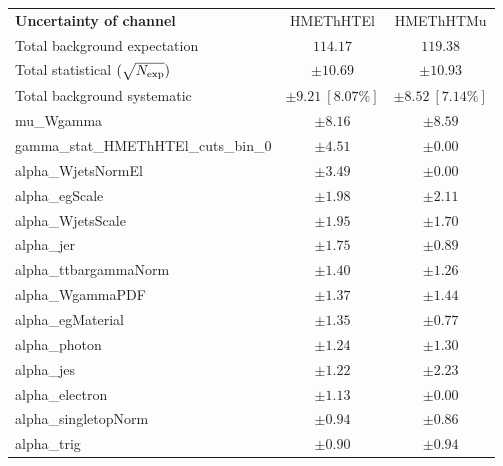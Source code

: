 
\begin{table}
\begin{center}
\setlength{\tabcolsep}{0.0pc}
\begin{tabular*}{\textwidth}{@{\extracolsep{\fill}}lcc}
\noalign{\smallskip}\hline\noalign{\smallskip}
{\bf Uncertainty of channel}                                    & HMEThHTEl            & HMEThHTMu            \\
\noalign{\smallskip}\hline\noalign{\smallskip}
Total background expectation             &  $114.17$        &  $119.38$       \\
\noalign{\smallskip}\hline\noalign{\smallskip}
Total statistical $(\sqrt{N_{\rm exp}})$              & $\pm 10.69$        & $\pm 10.93$       \\
Total background systematic               & $\pm 9.21\ [8.07\%] $        & $\pm 8.52\ [7.14\%] $             \\
\noalign{\smallskip}\hline\noalign{\smallskip}
\noalign{\smallskip}\hline\noalign{\smallskip}
mu\_Wgamma         & $\pm 8.16$          & $\pm 8.59$       \\
gamma\_stat\_HMEThHTEl\_cuts\_bin\_0         & $\pm 4.51$          & $\pm 0.00$       \\
alpha\_WjetsNormEl         & $\pm 3.49$          & $\pm 0.00$       \\
alpha\_egScale         & $\pm 1.98$          & $\pm 2.11$       \\
alpha\_WjetsScale         & $\pm 1.95$          & $\pm 1.70$       \\
alpha\_jer         & $\pm 1.75$          & $\pm 0.89$       \\
alpha\_ttbargammaNorm         & $\pm 1.40$          & $\pm 1.26$       \\
alpha\_WgammaPDF         & $\pm 1.37$          & $\pm 1.44$       \\
alpha\_egMaterial         & $\pm 1.35$          & $\pm 0.77$       \\
alpha\_photon         & $\pm 1.24$          & $\pm 1.30$       \\
alpha\_jes         & $\pm 1.22$          & $\pm 2.23$       \\
alpha\_electron         & $\pm 1.13$          & $\pm 0.00$       \\
alpha\_singletopNorm         & $\pm 0.94$          & $\pm 0.86$       \\
alpha\_trig         & $\pm 0.90$          & $\pm 0.94$       \\

\end{tabular*}
\end{center}
\end{table}
